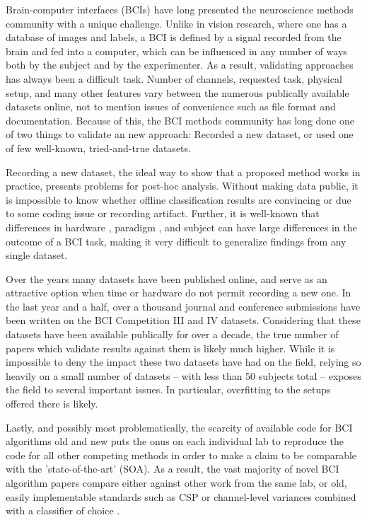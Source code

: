 Brain-computer interfaces (BCIs) have long presented the neuroscience methods
community with a unique challenge. Unlike in vision research, where one
has a database of images and labels, a BCI is defined by a signal
recorded from the brain and fed into a computer, which can be influenced in any
number of ways both by the subject and by the experimenter. As a result,
validating approaches has always been a difficult task. Number of channels,
requested task, physical setup, and many other features vary between the
numerous publically available datasets online, not to mention issues of
convenience such as file format and documentation. Because of this, the BCI
methods community has long done one of two things to validate an new approach:
Recorded a new dataset, or used one of few well-known, tried-and-true datasets.

Recording a new dataset, the ideal way to show that a proposed
method works in practice, presents problems for post-hoc analysis. Without
making data public, it is impossible to know whether offline
classification results are convincing or due to some coding issue or
recording artifact. Further, it is well-known that differences in
hardware \cite{Searle2000,Lopez-Gordo2014}, paradigm \cite{Allison2010}, and
subject \cite{Allison2010} can have large differences in the
outcome of a BCI task, making it very difficult to generalize findings
from any single dataset.

Over the years many datasets have been published online, and serve as an
attractive option when time or hardware do not permit recording a new one. In
the last year and a half, over a thousand journal and conference submissions
have been written on the BCI Competition III \cite{Blankertz2006,Schloegl2005}
and IV \cite{Tangermann2012} datasets. Considering that these datasets have been
available publically for over a decade, the true number of papers which validate
results against them is likely much higher. While it is impossible to deny
the impact these two datasets have had on the field, relying so heavily on
a small number of datasets -- with less than 50 subjects total -- exposes the field
to several important issues. In particular, overfitting to the setups offered
there is likely.

Lastly, and possibly most problematically, the scarcity of available code for
BCI algorithms old and new puts the onus on each individual lab to reproduce the
code for all other competing methods in order to make a claim to be comparable
with the 'state-of-the-art' (SOA). As a result, the vast majority of novel BCI
algorithm papers compare either against other work from the same lab, or old,
easily implementable standards such as CSP \cite{Koles1990} or
channel-level variances combined with a classifier of choice \cite{Garrett2003}.

